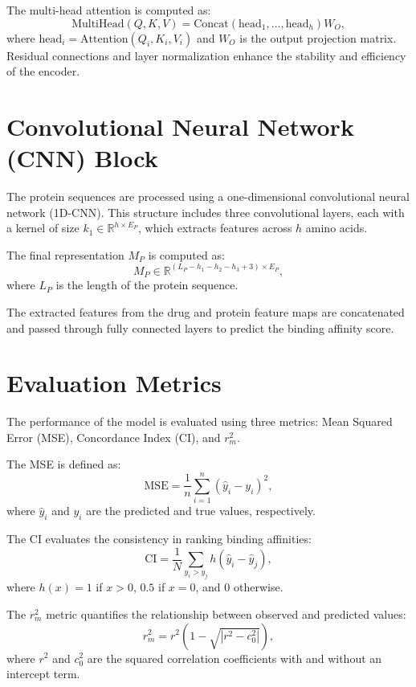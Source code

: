 \documentclass{article}
\begin{document}
The multi-head attention is computed as:
\begin{equation}
	\text{MultiHead}(Q, K, V) = \text{Concat}(\text{head}_1, \ldots, \text{head}_h) W_O,
\end{equation}
where $\text{head}_i = \text{Attention}(Q_i, K_i, V_i)$ and $W_O$ is the output projection matrix. Residual connections and layer normalization enhance the stability and efficiency of the encoder.

\section{Convolutional Neural Network (CNN) Block}
The protein sequences are processed using a one-dimensional convolutional neural network (1D-CNN). This structure includes three convolutional layers, each with a kernel of size $k_1 \in \mathbb{R}^{h \times E_P}$, which extracts features across $h$ amino acids.

The final representation $M_P$ is computed as:
\begin{equation}
	M_P \in \mathbb{R}^{(L_P - h_1 - h_2 - h_3 + 3) \times E_P},
\end{equation}
where $L_P$ is the length of the protein sequence.

The extracted features from the drug and protein feature maps are concatenated and passed through fully connected layers to predict the binding affinity score.

\section{Evaluation Metrics}
The performance of the model is evaluated using three metrics: Mean Squared Error (MSE), Concordance Index (CI), and $r_m^2$. 

The MSE is defined as:
\begin{equation}
	\text{MSE} = \frac{1}{n} \sum_{i=1}^{n} (\hat{y}_i - y_i)^2,
\end{equation}
where $\hat{y}_i$ and $y_i$ are the predicted and true values, respectively.

The CI evaluates the consistency in ranking binding affinities:
\begin{equation}
	\text{CI} = \frac{1}{N} \sum_{y_i > y_j} h(\hat{y}_i - \hat{y}_j),
\end{equation}
where $h(x) = 1$ if $x > 0$, $0.5$ if $x=0$, and $0$ otherwise.

The $r_m^2$ metric quantifies the relationship between observed and predicted values:
\begin{equation}
	r_m^2 = r^2 \left(1 - \sqrt{|r^2 - c_0^2|}\right),
\end{equation}
where $r^2$ and $c_0^2$ are the squared correlation coefficients with and without an intercept term.
\end{document}
